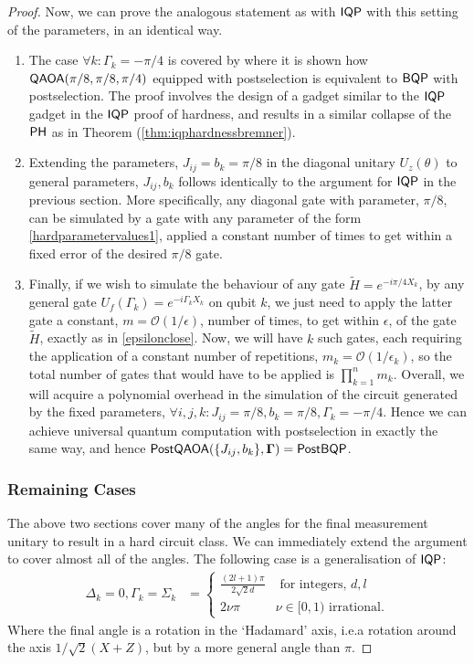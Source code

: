 \begin{proof}
Now, we can prove the analogous statement as with $\operatorname{\textsf{IQP}}$ with this setting of the parameters, in an identical way.
\begin{enumerate}
    \item The case $\forall k: \Gamma_k =  -\pi/4$ is covered by  where it is shown how $\operatorname{\textsf{QAOA}}(\pi/8, \pi/8, \pi/4)$ equipped with postselection is equivalent to $\textsf{BQP}$ with postselection. The proof involves the design of a gadget similar to the $\operatorname{\textsf{IQP}}$ gadget in the $\operatorname{\textsf{IQP}}$ proof of hardness, and results in a similar collapse of the $\operatorname{\textsf{PH}}$ as in Theorem (\ref{thm:iqphardnessbremner}).
    \item Extending the parameters, $J_{ij} = b_{k} = \pi/8$ in the diagonal unitary $U_z(\theta)$ to general parameters, $J_{ij}, b_k$ follows identically to the argument for $\operatorname{\textsf{IQP}}$ in the previous section. More specifically, any diagonal gate with parameter, $\pi/8$, can be simulated by a gate with any parameter of the form \eqref{hardparametervalues1}, applied a constant number of times to get within a fixed error of the desired $\pi/8$ gate.
    \item Finally, if we wish to simulate the behaviour of any gate $\tilde{H} = e^{-i\pi/4 X_k}$, by any general gate $U_f(\Gamma_k) =  e^{-i\Gamma_k X_k}$ on qubit $k$, we just need to apply the latter gate a constant, $m = \mathcal{O}(1/\epsilon)$, number of times, to get within $\epsilon$, of the gate $\tilde{H}$, exactly as in \eqref{epsilonclose}. Now, we will have $k$ such gates, each requiring the application of a constant number of repetitions, $m_k = \mathcal{O}(1/\epsilon_k)$, so the total number of gates that would have to be applied is $\prod\limits_{k=1}^n m_k$.
    Overall, we will acquire a polynomial overhead in the simulation of the circuit generated by the fixed parameters, $\forall i,j,k: J_{ij} = \pi/8,b_k =  \pi/8,\Gamma_k =  -\pi/4$. Hence we can achieve universal quantum computation with postselection in exactly the same way, and hence $\operatorname{\textsf{PostQAOA}}(\{J_{ij}, b_{k}\} , \mathbf{\Gamma}) = \operatorname{\textsf{PostBQP}}$.
\end{enumerate}



\subsubsection*{Remaining Cases}\label{ssec:remaininghardnesscases}
The above two sections cover many of the angles for the final measurement unitary to result in a hard circuit class. We can immediately extend the argument to cover almost all of the angles. 
The following case is a generalisation of $\operatorname{\textsf{IQP}}$:
\begin{align}
        \Delta_k = 0, \Gamma_k = \Sigma_k &=  
        \begin{cases}
            \frac{(2l+1)\pi}{2\sqrt{2}d} &\text{ for integers, } d, l\\
            2\nu \pi& \nu \in[0,1) \text{ irrational.}
        \end{cases}\label{hardparametervaluesgenhadamardapp}
\end{align}
Where the final angle is a rotation in the `Hadamard' axis, i.e.\@\@ a rotation around the axis $1/\sqrt{2}(X+Z)$, but by a more general angle than $\pi$.


\end{proof}
